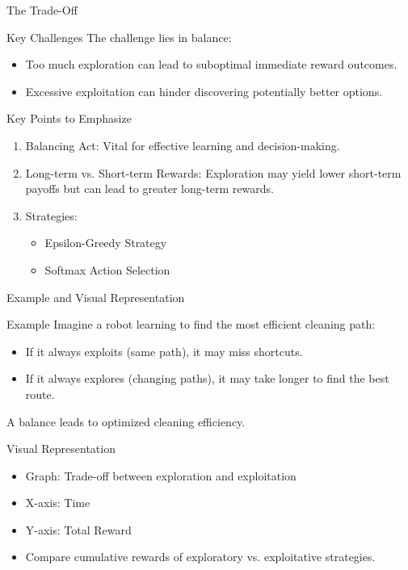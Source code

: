 \documentclass[aspectratio=169]{beamer}
\begin{document}
\begin{frame}[fragile]{The Trade-Off}
    \begin{block}{Key Challenges}
        The challenge lies in balance: 
        \begin{itemize}
            \item Too much exploration can lead to suboptimal immediate reward outcomes.
            \item Excessive exploitation can hinder discovering potentially better options.
        \end{itemize}
    \end{block}
    
    \begin{block}{Key Points to Emphasize}
        \begin{enumerate}
            \item Balancing Act: Vital for effective learning and decision-making.
            \item Long-term vs. Short-term Rewards: Exploration may yield lower short-term payoffs but can lead to greater long-term rewards.
            \item Strategies: 
                \begin{itemize}
                    \item Epsilon-Greedy Strategy
                    \item Softmax Action Selection
                \end{itemize}
        \end{enumerate}
    \end{block}
\end{frame}

\begin{frame}[fragile]{Example and Visual Representation}
    \begin{block}{Example}
        Imagine a robot learning to find the most efficient cleaning path:
        \begin{itemize}
            \item If it always exploits (same path), it may miss shortcuts.
            \item If it always explores (changing paths), it may take longer to find the best route.
        \end{itemize}
        A balance leads to optimized cleaning efficiency.
    \end{block}

    \begin{block}{Visual Representation}
        \begin{itemize}
            \item Graph: Trade-off between exploration and exploitation
            \item X-axis: Time
            \item Y-axis: Total Reward
            \item Compare cumulative rewards of exploratory vs. exploitative strategies.
        \end{itemize}
    \end{block}
\end{frame}
\end{document}

